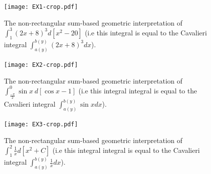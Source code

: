 \documentclass{article}
\theoremstyle{theorem}
\theoremstyle{definition}
\begin{document}
 \begin{figure}[htb]
 \centering
 \texttt{[image: EX1-crop.pdf]}
 \caption{The non-rectangular sum-based geometric interpretation of $\int_{1}^3 (2x+8)^3 d[x^2-20]$ (i.e this integral is equal to the 
 Cavalieri integral $\int_{a(y)}^{b(y)} (2x+8)^3 dx$).}
 \label{fig:ex1_sec}
 \end{figure}

\begin{figure}[htb]
\centering
\texttt{[image: EX2-crop.pdf]}
\caption{The non-rectangular sum-based geometric interpretation of $\int_{\frac{-\pi}{2}}^0 \sin{x}~d[\cos{x}-1]$ (i.e this integral integral is equal to the 
 Cavalieri integral $\int_{a(y)}^{b(y)} \sin{x} dx$).}
\label{fig:ex2_sec}
\end{figure}

\begin{figure}[htb]
\centering
\texttt{[image: EX3-crop.pdf]}
\caption{The non-rectangular sum-based geometric interpretation of $\int_1^2 \frac{1}{x} d[x^2+C]$ (i.e this integral integral is equal to the 
 Cavalieri integral $\int_{a(y)}^{b(y)} \frac{1}{x} dx$).}
\label{fig:ex3_sec}
\end{figure}
\end{document}
